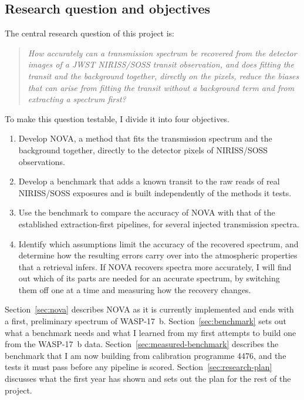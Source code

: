 \subsection{Research question and objectives}
\label{sec:research-question}

The central research question of this project is:
\begin{quote}
\raggedright\itshape
How accurately can a transmission spectrum be recovered from the detector
images of a JWST NIRISS/SOSS transit observation, and does fitting the
transit and the background together, directly on the pixels, reduce the
biases that can arise from fitting the transit without a background term and from extracting a spectrum first?
\end{quote}

To make this question testable, I divide it into four objectives.
\begin{enumerate}[label=\arabic*.,leftmargin=1.5em]
  \item Develop NOVA, a method that fits the transmission spectrum and the
  background together, directly to the detector pixels of NIRISS/SOSS
  observations.
  \item Develop a benchmark that adds a known transit to the raw reads of
  real NIRISS/SOSS exposures and is built independently of the methods it
  tests.
  \item Use the benchmark to compare the accuracy of NOVA with that of the
  established extraction-first pipelines, for several injected transmission
  spectra.
  \item Identify which assumptions limit the accuracy of the recovered
  spectrum, and determine how the resulting errors carry over into the
  atmospheric properties that a retrieval infers. If NOVA recovers spectra
  more accurately, I will find out which of its parts are needed for an accurate spectrum, by switching them off one at a time and measuring how the recovery changes.
\end{enumerate}

Section~\ref{sec:nova} describes NOVA as it is currently implemented and ends
with a first, preliminary spectrum of WASP-17~b. Section~\ref{sec:benchmark}
sets out what a benchmark needs and what I learned from my first attempts to
build one from the WASP-17~b data. Section~\ref{sec:measured-benchmark}
describes the benchmark that I am now building from calibration programme
4476, and the tests it must pass before any pipeline is scored.
Section~\ref{sec:research-plan} discusses what the first year has shown and
sets out the plan for the rest of the project.
